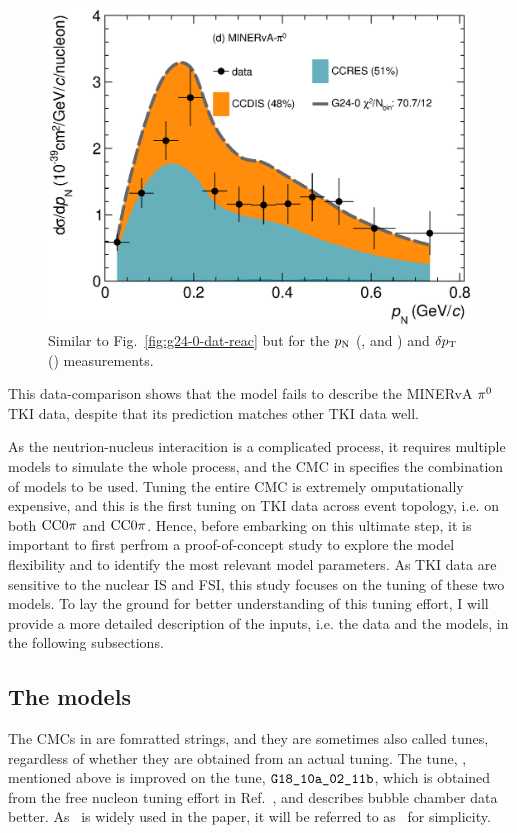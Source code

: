 \begin{figure}
    \includegraphics[width=\dbfigwid\textwidth]{figures/tuning/0000-min_pi0_pn_reac_decomp.eps}
    \caption{\label{fig:g24-0-pn-reac} Similar to Fig.~\ref{fig:g24-0-dat-reac} but for the $p_\textrm{N}$ (\ttkpip, \minzpi and \minpiz) and $\delta p_\textrm{T}$ (\ttkzpi) measurements.
    } 
\end{figure}
This data-comparison shows that the model fails to describe the MINERvA $\pi^0$ TKI data, despite that its prediction matches other TKI data well.

As the neutrion-nucleus interacition is a complicated process, it requires multiple models to simulate the whole process, and the CMC in \genie specifies the combination of models to be used.
Tuning the entire CMC is extremely omputationally expensive, and this is the first tuning on TKI data across event topology, i.e. on both $\textrm{CC}0\pi$ and $\textrm{CC}0\pi$. 
Hence, before embarking on this ultimate step, it is important to first perfrom a proof-of-concept study to explore the model flexibility and to identify the most relevant model parameters.
As TKI data are sensitive to the nuclear IS and FSI, this study focuses on the tuning of these two models.
To lay the ground for better understanding of this tuning effort, I will provide a more detailed description of the inputs, i.e. the data and the models, in the following subsections. 

\subsection{The models}
\label{sec:tuning-para-choice}
    The CMCs in \genie are fomratted strings, and they are sometimes also called tunes, regardless of whether they are obtained from an actual tuning.
    The tune, \newtune, mentioned above is improved on the tune, $\texttt{G18\_10a\_02\_11b}$, which is obtained from the free nucleon tuning effort in Ref.~\cite{GENIE:2021zuu}, and describes bubble chamber data better.
    As \newtune\ is widely used in the paper, it will be referred to as \gZero\ for simplicity. 


